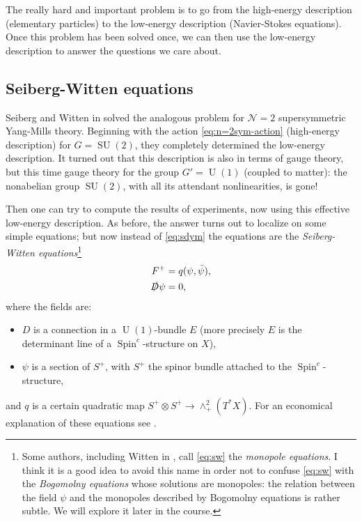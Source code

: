 \documentclass[12pt,letterpaper,reqno]{article}
\numberwithin{equation}{section}
\newcommand{\cN}{\ensuremath{\mathcal N}}
\newcommand{\ti}[1]{\textit{#1}}
\DeclareMathOperator{\Spin}{Spin}
\DeclareMathOperator{\SU}{SU}
\DeclareMathOperator{\U}{U}
\begin{document}
The really hard and important problem is to go from the high-energy
description (elementary particles) to the low-energy description
(Navier-Stokes equations). Once this problem has been solved once,
we can then use the low-energy description to answer the questions
we care about.


\subsection{Seiberg-Witten equations}

Seiberg and Witten in \cite{Seiberg:1994rs}
solved the analogous problem for $\cN=2$
supersymmetric Yang-Mills theory. Beginning with the action
\eqref{eq:n=2sym-action} (high-energy description) for $G = \SU(2)$,
they completely determined the low-energy description.
It turned out that this description is also in terms of gauge theory,
but this time gauge theory for the group $G' = \U(1)$ (coupled to matter):
the nonabelian group $\SU(2)$, with all its attendant
nonlinearities, is gone!

Then one can try to compute the results of experiments, now using this
effective low-energy description.
As before, the answer turns out to localize on some simple equations;
but now instead of \eqref{eq:sdym} the equations are
the \ti{Seiberg-Witten equations}\footnote{Some authors, including Witten in \cite{Witten:1994cg},
call \eqref{eq:sw} the \ti{monopole equations}. I think it is a good idea to avoid this name in order
not to confuse \eqref{eq:sw} with the \ti{Bogomolny equations} whose solutions are
monopoles: the relation between the field $\psi$ and the monopoles described by
Bogomolny equations is rather subtle. We will explore it later in the course.}
\begin{subequations} \label{eq:sw}
\begin{align}
  F^+ &= q(\psi, \bar\psi), \\
  \slashed{D} \psi &= 0,
\end{align}
\end{subequations}
where the fields are:
\begin{itemize}
\item $D$ is a connection in a $\U(1)$-bundle $E$
(more precisely $E$ is the determinant line of a $\Spin^c$-structure on $X$),
\item $\psi$ is a section of $S^+$, with $S^+$ the spinor bundle
attached to the $\Spin^c$-structure,
\end{itemize}
and $q$ is a certain
quadratic map $S^+ \otimes S^+ \to \wedge^2_+(T^* X)$.
For an economical explanation of these equations see
\cite{MR1367507}.
\end{document}
